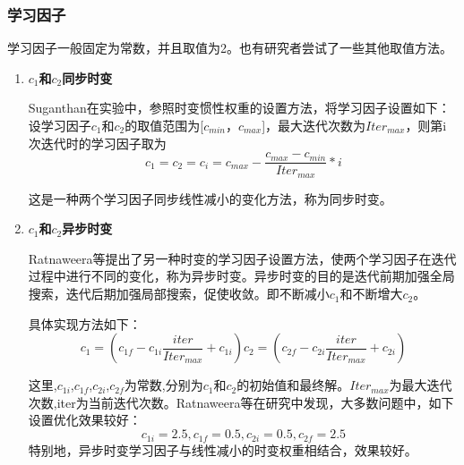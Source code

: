 \subsubsection{学习因子}
学习因子一般固定为常数，并且取值为2。也有研究者尝试了一些其他取值方法。

\begin{enumerate}
	\item \textbf{$c_1$和$c_2$同步时变}
	
	\hspace{2em}Suganthan在实验中，参照时变惯性权重的设置方法，将学习因子设置如下：设学习因子$c_1$和$c_2$的取值范围为[$c_{min}$，$c_{max}$]，最大迭代次数为$Iter_{max}$，则第i次迭代时的学习因子取为
	\begin{equation}
	c_1=c_2=c_i=c_{max}-\frac{c_{max}-c_{min}}{{Iter}_{max}}*i
	\end{equation}
	
	
	\hspace{2em}这是一种两个学习因子同步线性减小的变化方法，称为同步时变。
	
	\item \textbf{$c_1$和$c_2$异步时变}
	
	\hspace{2em}Ratnaweera等提出了另一种时变的学习因子设置方法\cite{Ratnaweera2004Self}，使两个学习因子在迭代过程中进行不同的变化，称为异步时变。异步时变的目的是迭代前期加强全局搜索，迭代后期加强局部搜索，促使收敛。即不断减小$c_1$和不断增大$c_2$。
	
	\hspace{2em}具体实现方法如下：
	\begin{equation}
	c_1=(c_{1f}-c_{1i}\frac{iter}{{Iter}_{max}}+c_{1i})
	c_2=(c_{2f}-c_{2i}\frac{iter}{{Iter}_{max}}+c_{2i})
	\end{equation}
	
	\hspace{2em}这里,$c_{1i}$,$c_{1f}$,$c_{2i}$,$c_{2f}$为常数,分别为$c_1$和$c_2$的初始值和最终解。${Iter}_{max}$为最大迭代次数,iter为当前迭代次数。Ratnaweera等在研究中发现，大多数问题中，如下设置优化效果较好：$$c_{1i}=2.5,c_{1f}=0.5,c_{2i}=0.5,c_{2f}=2.5$$\hspace{2em}特别地，异步时变学习因子与线性减小的时变权重相结合，效果较好。

\end{enumerate}

